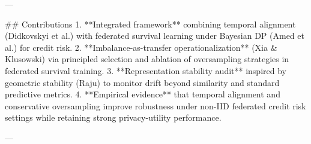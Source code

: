 ---

## Contributions  
1. **Integrated framework** combining temporal alignment (Didkovskyi et al.) with federated survival learning under Bayesian DP (Amed et al.) for credit risk.  
2. **Imbalance-as-transfer operationalization** (Xia & Klusowski) via principled selection and ablation of oversampling strategies in federated survival training.  
3. **Representation stability audit** inspired by geometric stability (Raju) to monitor drift beyond similarity and standard predictive metrics.  
4. **Empirical evidence** that temporal alignment and conservative oversampling improve robustness under non-IID federated credit risk settings while retaining strong privacy-utility performance.

---